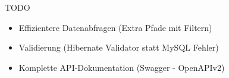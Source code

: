 \documentclass{beamer}
\begin{document}
\begin{frame}{TODO}

\begin{itemize}
\item Effizientere Datenabfragen (Extra Pfade mit Filtern)
\item Validierung (Hibernate Validator statt MySQL Fehler)
\item Komplette API-Dokumentation (Swagger - OpenAPIv2)
\end{itemize}

\end{frame}
\end{document}
